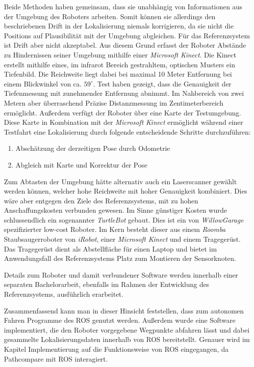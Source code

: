 Beide Methoden haben gemeinsam, dass sie unabhängig von Informationen aus der
Umgebung des Roboters arbeiten. Somit können sie allerdings den beschriebenen
Drift in der Lokalisierung niemals korrigieren, da sie nicht die Positions auf
Plausibilität mit der Umgebung abgleichen.  Für das Referenzsystem ist Drift
aber nicht akzeptabel. Aus diesem Grund erfasst der Roboter Abstände zu
Hindernissen seiner Umgebung mithilfe einer \textit{Microsoft Kinect}. Die
Kinect erstellt mithilfe eines, im infrarot Bereich gestrahltem, optischen
Musters ein Tiefenbild.  Die Reichweite liegt dabei bei maximal 10 Meter
Entfernung bei einem Blickwinkel von ca. $59^{\circ}$.
Test haben gezeigt, dass die Genauigkeit der Tiefenmessung mit zunehmender
Entfernung abnimmt. Im Nahbereich von zwei Metern aber überraschend Präzise
Distanzmessung im Zentimeterbereich ermöglicht.  Außerdem verfügt der Roboter
über eine Karte der Testumgebung. Diese Karte in Kombination mit der
\textit{Microsoft Kinect} ermöglicht während einer Testfahrt eine Lokalisierung
durch folgende entscheidende Schritte durchzuführen:

\begin{enumerate}
  \item Abschätzung der derzeitigen Pose durch Odometrie
  \item Abgleich mit Karte und Korrektur der Pose
\end{enumerate}

Zum Abtasten der Umgebung hätte alternativ auch ein Laserscanner gewählt werden
können, welcher hohe Reichweite mit hoher Genauigkeit kombiniert. Dies wäre
aber entgegen den Ziele des Referenzsystems, mit zu hohen Anschaffungskosten
verbunden gewesen. Im Sinne günstiger Kosten wurde schlussendlich ein
sogenannter \textit{TurtleBot} gebaut. Dies ist ein von \textit{WillowGarage}
spezifizierter low-cost Roboter.
Im Kern besteht dieser aus einem \textit{Roomba} Staubsaugerroboter von \textit{iRobot}, 
einer \textit{Microsoft Kinect} und einem Tragegerüst. Das Tragegerüst dient als
Abstellfläche für einen Laptop und bietet im Anwendungsfall des Referenzsystems
Platz zum Montieren der Sensorknoten.

Details zum Roboter und damit verbundener Software werden 
innerhalb einer separaten Bachelorarbeit, ebenfalls im Rahmen der
Entwicklung des Referenzsystems, ausführlich erarbeitet.

Zusammenfassend kann man in dieser Hinsicht feststellen, dass zum autonomen Fahren
Programme des \gls{ROS} genutzt werden. Außerdem wurde eine Software implementiert,
die den Roboter vorgegebene Wegpunkte abfahren lässt und dabei gesammelte
Lokalisierungsdaten innerhalb von \gls{ROS} bereitstellt. Genauer wird im
Kapitel Implementierung auf die Funktionsweise von \gls{ROS} eingegangen, da
Pathcompare mit ROS interagiert.

